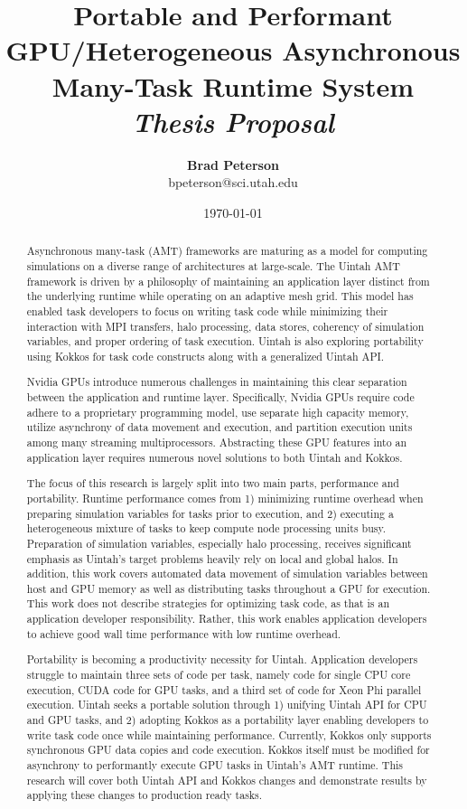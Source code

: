 \documentclass[12pt]{article}
\title{{\bf Portable and Performant GPU/Heterogeneous Asynchronous Many-Task Runtime System} \\
\it Thesis Proposal}
\author{ {\bf Brad Peterson}  \\
{\small bpeterson@sci.utah.edu}
}
\date{\today}
\begin{document}
\pagestyle{plain}
\maketitle

\pagebreak
\begin{abstract}

Asynchronous many-task (AMT) frameworks are maturing as a model for computing simulations on a diverse range of architectures at large-scale.  The Uintah AMT framework is driven by a philosophy of maintaining an application layer distinct from the underlying runtime while operating on an adaptive mesh grid.  This model has enabled task developers to focus on writing task code while minimizing their interaction with MPI transfers, halo processing, data stores, coherency of simulation variables, and proper ordering of task execution.   Uintah is also exploring portability using Kokkos for task code constructs along with a generalized Uintah API.  

Nvidia GPUs introduce numerous challenges in maintaining this clear separation between the application and runtime layer.  Specifically, Nvidia GPUs require code adhere to a proprietary programming model, use separate high capacity memory, utilize asynchrony of data movement and execution, and partition execution units among many streaming multiprocessors.  Abstracting these GPU features into an application layer requires numerous novel solutions to both Uintah and Kokkos.  

The focus of this research is largely split into two main parts, performance and portability.  Runtime performance comes from 1) minimizing runtime overhead when preparing simulation variables for tasks prior to execution, and 2) executing a heterogeneous mixture of tasks to keep compute node processing units busy.  Preparation of simulation variables, especially halo processing, receives significant emphasis as Uintah's target problems heavily rely on local and global halos.  In addition, this work covers automated data movement of simulation variables between host and GPU memory as well as distributing tasks throughout a GPU for execution.   This work does not describe strategies for optimizing task code, as that is an application developer responsibility.  Rather, this work enables application developers to achieve good wall time performance with low runtime overhead.   

Portability is becoming a productivity necessity for Uintah.  Application developers struggle to maintain three sets of code per task, namely code for single CPU core execution, CUDA code for GPU tasks, and a third set of code for Xeon Phi parallel execution.  Uintah seeks a portable solution through 1) unifying Uintah API for CPU and GPU tasks, and 2) adopting Kokkos as a portability layer enabling developers to write task code once while maintaining performance. Currently, Kokkos only supports synchronous GPU data copies and code execution.  Kokkos itself must be modified for asynchrony to performantly execute GPU tasks in Uintah's AMT runtime.  This research will cover both Uintah API and Kokkos changes and demonstrate results by applying these changes to production ready tasks.  
   

\end{abstract}
\end{document}

